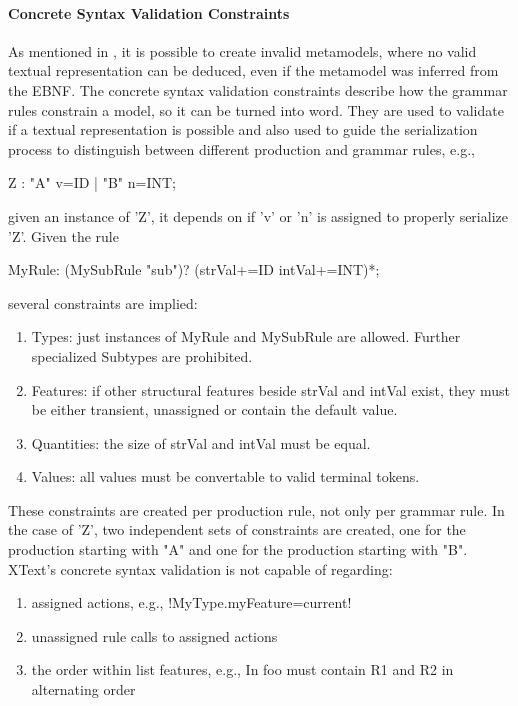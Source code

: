 \paragraph{Concrete Syntax Validation Constraints} \label{para:xtextVal}
As mentioned in \cite{MofCfg}, it is possible to create invalid metamodels, where no valid textual representation can be deduced, even if the metamodel was inferred from the EBNF. The concrete syntax validation constraints describe how the grammar rules constrain a model, so it can be turned into word. They are used to validate if a textual representation is possible and also used to guide the serialization process to distinguish between different production and grammar rules, e.g.,
\begin{xtxt}
Z 	:  "A" v=ID  
	|  "B" n=INT;
\end{xtxt}
given an instance of 'Z', it depends on if 'v' or 'n' is assigned to properly serialize 'Z'.
Given the rule
\begin{xtxt}
MyRule:	({MySubRule} "sub")? (strVal+=ID intVal+=INT)*;
\end{xtxt}
several constraints are implied:
\begin{enumerate}
	\item Types: just instances of MyRule and MySubRule are allowed. Further specialized Subtypes are prohibited. 
	\item Features: if other structural features beside strVal and intVal exist, they must be either transient, unassigned or contain the default value.
	\item Quantities: the size of strVal and intVal must be equal.
	\item Values: all values must be convertable to valid terminal tokens.
\end{enumerate}
These constraints are created per production rule, not only per grammar rule. In the case of 'Z', two independent sets of constraints are created, one for the production starting with "A" and one for the production starting with "B".
XText's concrete syntax validation is not capable of regarding:
\begin{enumerate}
	\item assigned actions, e.g., 
	\kode!{MyType.myFeature=current}!
	\item unassigned rule calls to assigned actions
	\item the order within list features, e.g., In  foo must contain R1 and R2 in alternating order
\end{enumerate}

